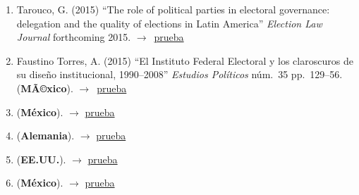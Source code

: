 \documentclass[12 pt, letter]{article}
\newenvironment{CitasMiTrabajo}{
    \begin{footnotesize}
    \begin{enumerate}[label={\footnotesize\emph{cita~\arabic*}},ref=\arabic*] %
        \setlength{\itemsep}{.1\itemsep}
        \setlength{\parskip}{.1\parskip}
    }{\end{enumerate}\end{footnotesize}}
\begin{document}
\begin{CitasMiTrabajo}
       \item Tarouco, G. (2015)
            ``The role of political parties in electoral governance: delegation and the quality of elections in Latin America'' 
            \emph{Election Law Journal} forthcoming 2015. $\rightarrow$~\href{http://ericmagar.com/cv/cites/estevezEtalElecStud/taroucoRolePtiesEllGovernance2015elj.pdf}{prueba}

        \item Faustino Torres, A. (2015)
            ``El Instituto Federal Electoral y los claroscuros de su dise\~no institucional, 1990--2008''
            \emph{Estudios Pol\'iticos} n\'um.\ 35 pp.\ 129--56. (\textbf{MÃ©xico}). $\rightarrow$~\href{http://ericmagar.com/cv/cites/estevezEtalElecStud/faustino.excerpt.pdf}{prueba}

        \item {} (\textbf{M\'exico}).  $\rightarrow$ \href{http://ericmagar.com/cv/cites/estevezEtalElecStud/diazdominguezConfianzaElec2015nexos.pdf}{prueba}

        \item {} (\textbf{Alemania}).  $\rightarrow$ \href{http://ericmagar.com/cv/cites/estevezEtalElecStud/martin2015.pdf}{prueba}

        \item {} (\textbf{EE.UU.}).  $\rightarrow$ \href{http://ericmagar.com/cv/cites/estevezEtalElecStud/hyde2015.pdf}{prueba}

        \item {} (\textbf{M\'exico}).  $\rightarrow$ \href{http://ericmagar.com/cv/cites/estevezEtalElecStud/diazDominguezTrifeGasto2016pl.pdf}{prueba}

        \label{ncites:estevez.magar.rosas.2008} %


\end{CitasMiTrabajo}
\end{document}
